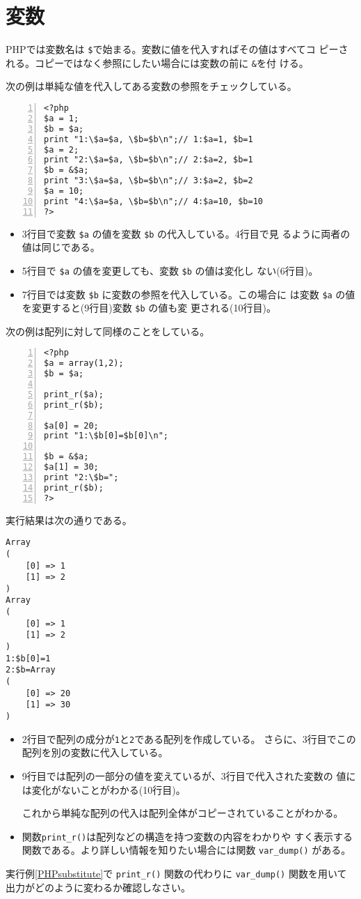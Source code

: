 \section{変数}
PHPでは変数名は \texttt{\$}で始まる。変数に値を代入すればその値はすべてコ
ピーされる。コピーではなく参照にしたい場合には変数の前に \texttt{\&}を付
ける。
\begin{Exec}\upshape\label{PHPsubstitute}
次の例は単純な値を代入してある変数の参照をチェックしている。
\begin{Verbatim}[numbers=left]
<?php
$a = 1;
$b = $a;
print "1:\$a=$a, \$b=$b\n";// 1:$a=1, $b=1
$a = 2;
print "2:\$a=$a, \$b=$b\n";// 2:$a=2, $b=1
$b = &$a;
print "3:\$a=$a, \$b=$b\n";// 3:$a=2, $b=2
$a = 10;
print "4:\$a=$a, \$b=$b\n";// 4:$a=10, $b=10
?>
\end{Verbatim}
 \begin{itemize}
  \item 3行目で変数 \Verb+$a+ の値を変数 \Verb+$b+ の代入している。4行目で見
        るように両者の値は同じである。
  \item 5行目で \Verb+$a+ の値を変更しても、変数 \Verb+$b+ の値は変化し
        ない(6行目)。
  \item 7行目では変数 \Verb+$b+ に変数の参照を代入している。この場合に
        は変数 \Verb+$a+ の値を変更すると(9行目)変数 \Verb+$b+ の値も変
        更される(10行目)。
 \end{itemize}
 次の例は配列に対して同様のことをしている。
\begin{Verbatim}[numbers=left]
<?php
$a = array(1,2);
$b = $a;

print_r($a);
print_r($b);

$a[0] = 20;
print "1:\$b[0]=$b[0]\n";

$b = &$a;
$a[1] = 30;
print "2:\$b=";
print_r($b);
?>
\end{Verbatim}
実行結果は次の通りである。
\begin{Verbatim}
Array
(
    [0] => 1
    [1] => 2
)
Array
(
    [0] => 1
    [1] => 2
)
1:$b[0]=1
2:$b=Array
(
    [0] => 20
    [1] => 30
)

\end{Verbatim}
\begin{itemize}
 \item 2行目で配列の成分が\texttt{1}と\texttt{2}である配列を作成している。
       さらに、3行目でこの配列を別の変数に代入している。
 \item 9行目では配列の一部分の値を変えているが、3行目で代入された変数の
       値には変化がないことがわかる(10行目)。

       これから単純な配列の代入は配列全体がコピーされていることがわかる。
 \item 関数\texttt{print\_r()}は配列などの構造を持つ変数の内容をわかりや
 すく表示する関数である。より詳しい情報を知りたい場合には関数
       \Verb+var_dump()+ がある。
\end{itemize}
\end{Exec}
 \begin{Prob}\upshape
  実行例\ref{PHPsubstitute}で \Verb+print_r()+ 関数の代わりに
   \Verb+var_dump()+ 関数を用いて出力がどのように変わるか確認しなさい。
 \end{Prob}
